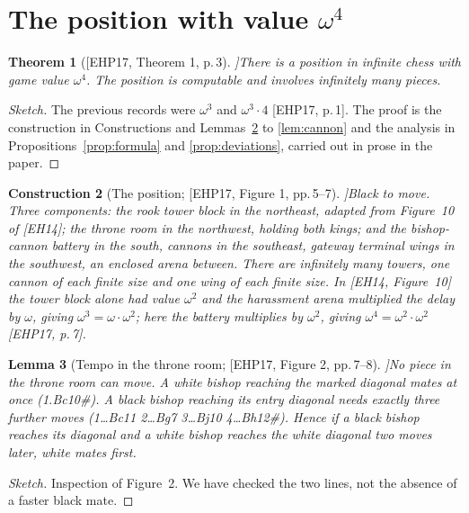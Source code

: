 \documentclass[10pt]{article}
\theoremstyle{notes}
\newtheorem{theorem}{Theorem}[section]
\newtheorem{lemma}[theorem]{Lemma}
\newtheorem{construction}[theorem]{Construction}
\newenvironment{sketch}{\begin{proof}[Sketch]\renewcommand{\qedsymbol}{}}{\end{proof}}
\newcommand{\EHP}[1]{[EHP17, #1]}
\begin{document}
\section{The position with value \texorpdfstring{$\omega^4$}{omega to the fourth}}

\begin{theorem}[\EHP{Theorem 1, p.\,3}]\label{thm:omega4}
There is a position in infinite chess with game value $\omega^4$. The position is computable and involves
infinitely many pieces.
\end{theorem}

\begin{sketch}
The previous records were $\omega^3$ and $\omega^3\cdot 4$ \EHP{p.\,1}. The proof is the construction in
Constructions and Lemmas~\ref{con:position} to \ref{lem:cannon} and the analysis in
Propositions~\ref{prop:formula} and \ref{prop:deviations}, carried out in prose in the paper.
\end{sketch}

\begin{construction}[The position; \EHP{Figure 1, pp.\,5--7}]\label{con:position}
Black to move. Three components: the \emph{rook tower block} in the northeast, adapted from Figure~10 of
[EH14]; the \emph{throne room} in the northwest, holding both kings; and the \emph{bishop-cannon battery}
in the south, cannons in the southeast, gateway terminal wings in the southwest, an enclosed arena between.
There are infinitely many towers, one cannon of each finite size and one wing of each finite size. In [EH14,
Figure~10] the tower block alone had value $\omega^2$ and the harassment arena multiplied the delay by
$\omega$, giving $\omega^3=\omega\cdot\omega^2$; here the battery multiplies by $\omega^2$, giving
$\omega^4=\omega^2\cdot\omega^2$ \EHP{p.\,7}.
\end{construction}

\begin{lemma}[Tempo in the throne room; \EHP{Figure 2, pp.\,7--8}]\label{lem:tempo}
No piece in the throne room can move. A white bishop reaching the marked diagonal mates at once
(1.Bc10\#). A black bishop reaching its entry diagonal needs exactly three further moves
(1\ldots Bc11 2\ldots Bg7 3\ldots Bj10 4\ldots Bh12\#). Hence if a black bishop reaches its diagonal and a
white bishop reaches the white diagonal two moves later, white mates first.
\end{lemma}

\begin{sketch}
Inspection of Figure~2. We have checked the two lines, not the absence of a faster black mate.
\end{sketch}
\end{document}
